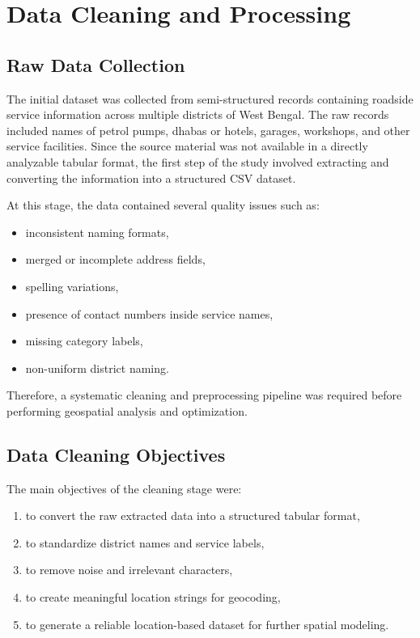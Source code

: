 \section{Data Cleaning and Processing}

\subsection{Raw Data Collection}

The initial dataset was collected from semi-structured records containing roadside service information across multiple districts of West Bengal. The raw records included names of petrol pumps, dhabas or hotels, garages, workshops, and other service facilities. Since the source material was not available in a directly analyzable tabular format, the first step of the study involved extracting and converting the information into a structured CSV dataset.

At this stage, the data contained several quality issues such as:
\begin{itemize}
    \item inconsistent naming formats,
    \item merged or incomplete address fields,
    \item spelling variations,
    \item presence of contact numbers inside service names,
    \item missing category labels,
    \item non-uniform district naming.
\end{itemize}

Therefore, a systematic cleaning and preprocessing pipeline was required before performing geospatial analysis and optimization.

\subsection{Data Cleaning Objectives}

The main objectives of the cleaning stage were:
\begin{enumerate}
    \item to convert the raw extracted data into a structured tabular format,
    \item to standardize district names and service labels,
    \item to remove noise and irrelevant characters,
    \item to create meaningful location strings for geocoding,
    \item to generate a reliable location-based dataset for further spatial modeling.
\end{enumerate}

